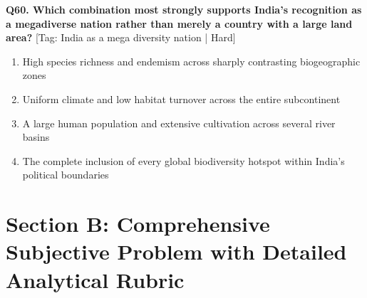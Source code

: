 \noindent\textbf{Q60. Which combination most strongly supports India's recognition as a megadiverse nation rather than merely a country with a large land area?} \hfill [Tag: India as a mega diversity nation | Hard]
\begin{enumerate}[label=(\alph*),topsep=2pt,itemsep=1pt,partopsep=0pt,parsep=0pt]
    \item {High species richness and endemism across sharply contrasting biogeographic zones}
    \item {Uniform climate and low habitat turnover across the entire subcontinent}
    \item {A large human population and extensive cultivation across several river basins}
    \item {The complete inclusion of every global biodiversity hotspot within India's political boundaries}
\end{enumerate}
\vspace{2mm}


\section{Section B: Comprehensive Subjective Problem with Detailed Analytical Rubric}

